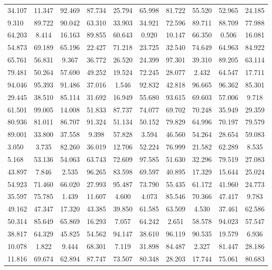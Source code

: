 \documentclass{article}
\begin{document}
\begin{table}[h!]
\begin{tabular}{lccccccccc}
34.107 & 11.347 & 92.469 & 87.734 & 25.794 & 65.998 & 81.722 & 55.520 & 52.965 & 24.185 \\
9.310 & 89.722 & 90.042 & 63.310 & 33.903 & 34.921 & 72.596 & 89.711 & 88.709 & 77.988 \\
64.203 & 8.414 & 16.163 & 89.855 & 60.643 & 0.920 & 10.147 & 66.350 & 0.506 & 16.081 \\
54.873 & 69.189 & 65.196 & 22.427 & 71.218 & 23.725 & 32.540 & 74.649 & 64.963 & 84.922 \\
65.761 & 56.831 & 9.367 & 36.772 & 26.520 & 24.399 & 97.301 & 39.310 & 89.205 & 63.114 \\
79.481 & 50.264 & 57.690 & 49.252 & 19.524 & 72.245 & 28.077 & 2.432 & 64.547 & 17.711 \\
94.046 & 95.393 & 91.486 & 37.016 & 1.546 & 92.832 & 42.818 & 96.665 & 96.362 & 85.301 \\
29.445 & 38.510 & 85.114 & 31.692 & 16.949 & 55.680 & 93.615 & 69.603 & 57.006 & 9.718 \\
61.501 & 99.005 & 14.008 & 51.833 & 87.737 & 74.077 & 69.702 & 70.248 & 35.949 & 29.359 \\
80.936 & 81.011 & 86.707 & 91.324 & 51.134 & 50.152 & 79.829 & 64.996 & 70.197 & 79.579 \\
89.001 & 33.800 & 37.558 & 9.398 & 57.828 & 3.594 & 46.560 & 54.264 & 28.654 & 59.083 \\
3.050 & 3.735 & 82.260 & 36.019 & 12.706 & 52.224 & 76.999 & 21.582 & 62.289 & 8.535 \\
5.168 & 53.136 & 54.063 & 63.743 & 72.609 & 97.585 & 51.630 & 32.296 & 79.519 & 27.083 \\
43.897 & 7.846 & 2.535 & 96.265 & 83.598 & 69.597 & 40.895 & 17.329 & 15.644 & 25.024 \\
54.923 & 71.460 & 66.020 & 27.993 & 95.487 & 73.790 & 55.435 & 61.172 & 41.960 & 24.773 \\
35.597 & 75.785 & 1.439 & 11.607 & 4.600 & 4.073 & 85.546 & 70.366 & 47.417 & 9.783 \\
49.162 & 47.347 & 17.320 & 43.385 & 39.850 & 61.585 & 63.509 & 4.530 & 37.461 & 62.586 \\
50.314 & 85.649 & 65.869 & 16.293 & 7.057 & 64.242 & 2.651 & 58.578 & 94.023 & 57.547 \\
38.817 & 64.329 & 45.825 & 54.562 & 94.147 & 38.610 & 96.119 & 90.535 & 19.579 & 6.936 \\
10.078 & 1.822 & 9.444 & 68.301 & 7.119 & 31.898 & 84.487 & 2.327 & 81.447 & 28.186 \\
11.816 & 69.674 & 62.894 & 87.747 & 73.507 & 80.348 & 28.203 & 17.744 & 75.061 & 80.683 \\

\end{tabular}
\end{table}
\end{document}
